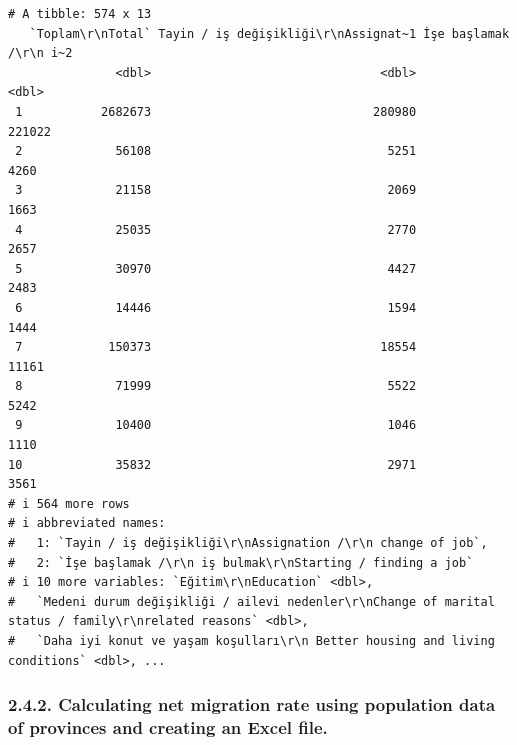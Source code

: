 \documentclass[
  11pt,
  a4paper,
  DIV=11,
  numbers=noendperiod]{scrartcl}
\begin{document}
\begin{verbatim}
# A tibble: 574 x 13
   `Toplam\r\nTotal` Tayin / iş değişikliği\r\nAssignat~1 İşe başlamak /\r\n i~2
               <dbl>                                <dbl>                  <dbl>
 1           2682673                               280980                 221022
 2             56108                                 5251                   4260
 3             21158                                 2069                   1663
 4             25035                                 2770                   2657
 5             30970                                 4427                   2483
 6             14446                                 1594                   1444
 7            150373                                18554                  11161
 8             71999                                 5522                   5242
 9             10400                                 1046                   1110
10             35832                                 2971                   3561
# i 564 more rows
# i abbreviated names:
#   1: `Tayin / iş değişikliği\r\nAssignation /\r\n change of job`,
#   2: `İşe başlamak /\r\n iş bulmak\r\nStarting / finding a job`
# i 10 more variables: `Eğitim\r\nEducation` <dbl>,
#   `Medeni durum değişikliği / ailevi nedenler\r\nChange of marital status / family\r\nrelated reasons` <dbl>,
#   `Daha iyi konut ve yaşam koşulları\r\n Better housing and living conditions` <dbl>, ...
\end{verbatim}

\subsubsection{2.4.2. Calculating net migration rate using population
data of provinces and creating an Excel
file.}\label{calculating-net-migration-rate-using-population-data-of-provinces-and-creating-an-excel-file.}
\end{document}
